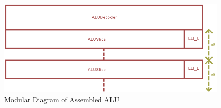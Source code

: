 \begin{figure}[h]
	\centering
	\includegraphics[scale=0.75]{Figures/ALUModular.png}
	\caption{Modular Diagram of Assembled ALU}
	\label{fig:ALUAssembled}
\end{figure}
